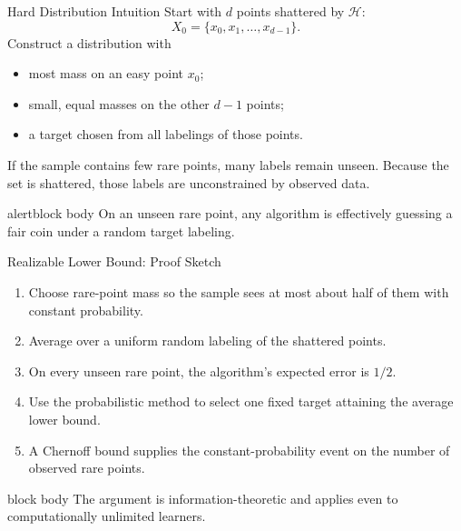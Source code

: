 \documentclass[aspectratio=169,10pt]{beamer}
\newcommand{\Hc}{\mathcal{H}}
\newcommand{\KeyBox}[1]{%
  \begin{beamercolorbox}[rounded=true,sep=0.22cm,wd=\linewidth]{block body}
    #1
  \end{beamercolorbox}%
}
\newcommand{\OrangeBox}[1]{%
  \begin{beamercolorbox}[rounded=true,sep=0.22cm,wd=\linewidth]{alertblock body}
    #1
  \end{beamercolorbox}%
}
\begin{document}
\begin{frame}[t]{Hard Distribution Intuition}
  \vspace{0.01cm}
  Start with $d$ points shattered by $\Hc$:
  \[
    X_0=\{x_0,x_1,\ldots,x_{d-1}\}.
  \]
  Construct a distribution with
  \begin{itemize}
    \setlength{\itemsep}{0.12cm}
    \item most mass on an easy point $x_0$;
    \item small, equal masses on the other $d-1$ points;
    \item a target chosen from all labelings of those points.
  \end{itemize}
  \vspace{0.05cm}
  If the sample contains few rare points, many labels remain unseen. Because the set is shattered, those labels are unconstrained by observed data.
  \vspace{0.06cm}
  \OrangeBox{On an unseen rare point, any algorithm is effectively guessing a fair coin under a random target labeling.}
\end{frame}

\begin{frame}[t]{Realizable Lower Bound: Proof Sketch}
  \vspace{0.01cm}
  \begin{enumerate}
    \setlength{\itemsep}{0.12cm}
    \item Choose rare-point mass so the sample sees at most about half of them with constant probability.
    \item Average over a uniform random labeling of the shattered points.
    \item On every unseen rare point, the algorithm's expected error is $1/2$.
    \item Use the probabilistic method to select one fixed target attaining the average lower bound.
    \item A Chernoff bound supplies the constant-probability event on the number of observed rare points.
  \end{enumerate}
  \vspace{0.06cm}
  \KeyBox{The argument is information-theoretic and applies even to computationally unlimited learners.}
\end{frame}
\end{document}
